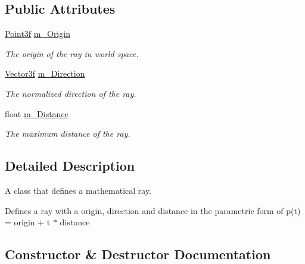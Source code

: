 \subsection*{Public Attributes}
\begin{DoxyCompactItemize}
\item 
\mbox{\label{class_ray_a78772e0d4e59fe43e56e468998462091}} 
\mbox{\hyperlink{class_point}{Point3f}} \mbox{\hyperlink{class_ray_a78772e0d4e59fe43e56e468998462091}{m\+\_\+\+Origin}}
\begin{DoxyCompactList}\small\item\em The origin of the ray in world space. \end{DoxyCompactList}\item 
\mbox{\label{class_ray_a1920e38e48d76676ff0f91b7f5b023f1}} 
\mbox{\hyperlink{class_vector3}{Vector3f}} \mbox{\hyperlink{class_ray_a1920e38e48d76676ff0f91b7f5b023f1}{m\+\_\+\+Direction}}
\begin{DoxyCompactList}\small\item\em The normalized direction of the ray. \end{DoxyCompactList}\item 
\mbox{\label{class_ray_a17641c10c1dd52c672ca2f744630274b}} 
float \mbox{\hyperlink{class_ray_a17641c10c1dd52c672ca2f744630274b}{m\+\_\+\+Distance}}
\begin{DoxyCompactList}\small\item\em The maximum distance of the ray. \end{DoxyCompactList}\end{DoxyCompactItemize}


\subsection{Detailed Description}
A class that defines a mathematical ray. 

Defines a ray with a origin, direction and distance in the parametric form of p(t) = origin + t $\ast$ distance 

\subsection{Constructor \& Destructor Documentation}
\mbox{\label{class_ray_a2a7cfa3d7fc1cf6bb6365fb21b48a0b0}} 
